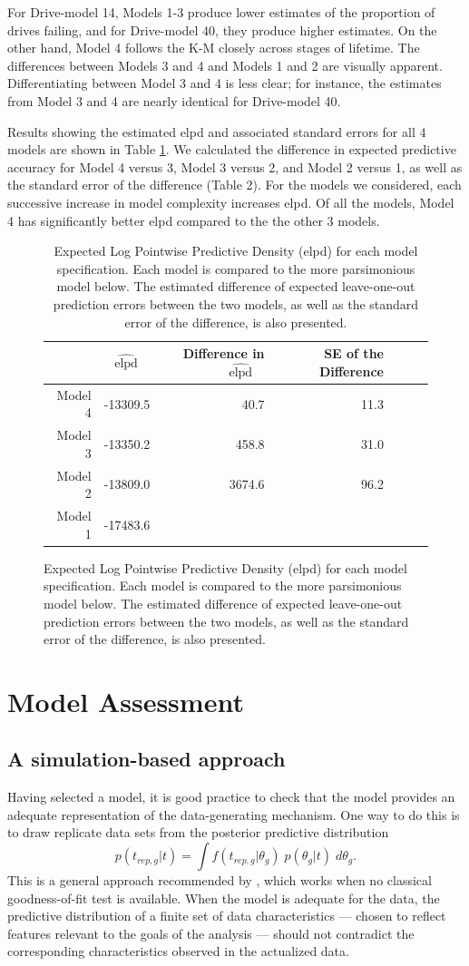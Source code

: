 \documentclass[12pt]{article}
\begin{document}
For Drive-model 14, Models 1-3 produce lower estimates of the proportion of drives failing, and for Drive-model 40, they produce higher estimates.  On the other hand, Model 4 follows the K-M closely across stages of lifetime.  The differences between Models 3 and 4 and Models 1 and 2 are visually apparent.  Differentiating between Model 3 and 4 is less clear; for instance, the estimates from Model 3 and 4 are nearly identical for Drive-model 40.


Results showing the estimated elpd and associated standard errors for all 4 models are shown in Table \ref{table:2}.
We calculated the difference in expected predictive accuracy for Model 4 versus 3, Model 3 versus 2, and Model 2 versus 1, as well as the standard error of the difference (Table 2). For the models we considered, each successive increase in model complexity increases elpd.  Of all the models, Model 4 has significantly better elpd compared to the the other 3 models.

\begin{figure}
\begin{table}[H]
\centering
\begin{tabular}{rrrrrrr}
  \hline
 & $\widehat{\text{elpd}}$ \ & Difference in $\widehat{\text{elpd}}$ \ & SE of the Difference \\ 
  \hline
Model 4 & -13309.5 & 40.7 & 11.3 \\ 
Model 3 & -13350.2 & 458.8 & 31.0  \\ 
Model 2 & -13809.0 & 3674.6 & 96.2 \\ 
Model 1 & -17483.6  \\ 
   \hline
\end{tabular}
\caption{Expected Log Pointwise Predictive Density (elpd) for each model specification.  Each model is compared to the more parsimonious model below.  The estimated difference of expected leave-one-out prediction errors between the two models, as well as the standard error of the difference, is also presented.}
\label{table:2}
\end{table}
\end{figure}

\section{Model Assessment}
\subsection{A simulation-based approach}
\label{model-assessment}
Having selected a model, it is good practice to check that the model provides an adequate representation of the data-generating mechanism. One way to do this is to draw replicate data sets from the posterior predictive distribution
$$p(t_{rep,g}|t) = \int f(t_{rep,g}|\theta_g)\; p(\theta_g|t)\;d\theta_g.$$
This is a general approach recommended by \cite{gelman1996postpred}, which works when no classical goodness-of-fit test is available. When the model is adequate for the data, the predictive distribution of a finite set of data characteristics --- chosen to reflect features relevant to the goals of the analysis --- should not contradict the corresponding characteristics observed in the actualized data.
\end{document}
